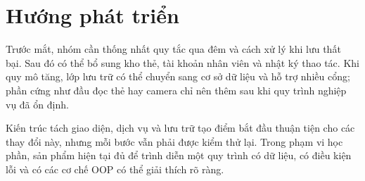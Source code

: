 \section{Hướng phát triển}
Trước mắt, nhóm cần thống nhất quy tắc qua đêm và cách xử lý khi lưu thất bại. Sau đó có thể bổ sung kho thẻ, tài khoản nhân viên và nhật ký thao tác. Khi quy mô tăng, lớp lưu trữ có thể chuyển sang cơ sở dữ liệu và hỗ trợ nhiều cổng; phần cứng như đầu đọc thẻ hay camera chỉ nên thêm sau khi quy trình nghiệp vụ đã ổn định.

Kiến trúc tách giao diện, dịch vụ và lưu trữ tạo điểm bắt đầu thuận tiện cho các thay đổi này, nhưng mỗi bước vẫn phải được kiểm thử lại. Trong phạm vi học phần, sản phẩm hiện tại đủ để trình diễn một quy trình có dữ liệu, có điều kiện lỗi và có các cơ chế OOP có thể giải thích rõ ràng.
